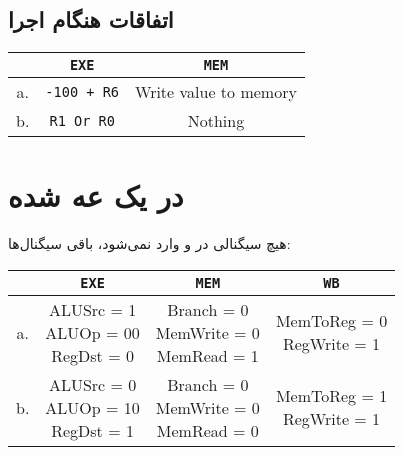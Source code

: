 \documentclass[11pt, dvipsnames, svgnames, x11names]{article}
\begin{document}
\subsection{اتفاقات هنگام اجرا}
\begin{latin}
\begin{table}[H]
\begin{center}
\begin{tabular}{|c|c|c|}
\hline
&
\texttt{EXE}&
\texttt{MEM}\\
\hline
\hline
a. &
\texttt{-100 + R6}&
Write value to memory \\
\hline
b. &
\texttt{R1 Or R0} &
Nothing \\
\hline
\end{tabular}
\end{center}
\end{table}
\end{latin}

\section{ در یک  عه  شده}
هیچ سیگنالی در 
و
وارد نمی‌شود، باقی سیگنال‌ها:
\begin{latin}
\begin{table}[H]
\begin{center}
\begin{tabular}{|c|c|c|c|}
\hline
&
\texttt{EXE} &
\texttt{MEM}&
\texttt{WB}
\\
\hline
\hline
a. &
\makecell[l]{
ALUSrc = 1 \\
ALUOp = 00 \\
RegDst = 0}&
\makecell[l]{
Branch = 0 \\
MemWrite = 0 \\
MemRead = 1}&
\makecell[l]{
MemToReg = 0 \\
RegWrite = 1}
\\
\hline
b. &
\makecell[l]{
ALUSrc = 0 \\
ALUOp = 10 \\
RegDst = 1}&
\makecell[l]{
Branch = 0 \\
MemWrite = 0 \\
MemRead = 0}&
\makecell[l]{
MemToReg = 1 \\
RegWrite = 1}
\\
\hline
\end{tabular}
\end{center}
\end{table}
\end{latin}
\end{document}
